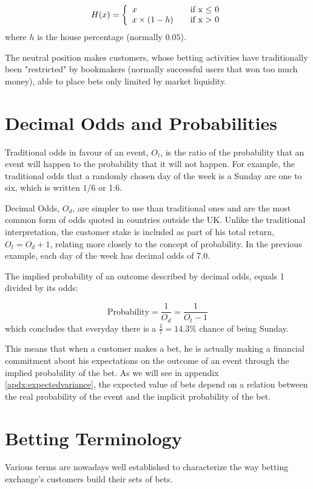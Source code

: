 \documentclass{article}
\begin{document}
\begin{equation}
\label{eq:commision}
    H(x) = \left\{
    \begin{array}{l l}
        x              & \quad \text{if x $\leq$ 0}\\
        x \times (1-h) & \quad \text{if x $>$ 0}\\
    \end{array} \right.
\end{equation}
where $h$ is the house percentage (normally $0.05$).

The neutral position makes customers, whose betting activities have 
traditionally been "restricted" by bookmakers (normally successful 
users that won too much money), able to place bets only limited by 
market liquidity. \cite{laffey2005}

\section{Decimal Odds and Probabilities}
\label{sec:decimalOddsAndProbabilities}
Traditional odds in favour of an event, $O_{t}$, is the ratio of the 
probability that an event will happen to the probability that it 
will not happen. For example, the traditional odds that a randomly 
chosen day of the week is a Sunday are one to six, which is written 
$1/6$ or 1:6. 

Decimal Odds, $O_{d}$, are simpler to use than traditional ones and 
are the most common form of odds quoted in countries outside the UK. 
Unlike the traditional interpretation, the customer stake is 
included as part of his total return, $O_{t}=O_{d}+1$, relating more 
closely to the concept of probability. In the previous example, each 
day of the week has decimal odds of 7.0.

The implied probability of an outcome described by decimal odds, 
equals 1 divided by its odds:

\[
\text{Probability}=\frac{1}{O_{d}}=\frac{1}{O_{t}-1}
\]
which concludes that everyday there is a $\frac{1}{7} = 14.3\%$ 
chance of being Sunday.

This means that when a customer makes a bet, he is actually making a 
financial commitment about his expectations on the outcome of an 
event through the implied probability of the bet. As we will see in 
appendix \ref{apdx:expectedvariance}, the expected value of bets 
depend on a relation between the real probability of the event and 
the implicit probability of the bet.

\section{Betting Terminology}
Various terms are nowadays well established to characterize the way 
betting exchange's customers build their sets of bets.
\end{document}
